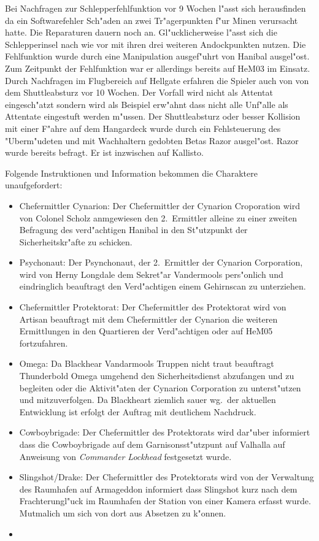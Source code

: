 Bei Nachfragen zur Schlepperfehlfunktion vor 9 Wochen l"asst sich herausfinden da\3 ein Softwarefehler Sch"aden an zwei Tr"agerpunkten f"ur Minen verursacht hatte. Die Reparaturen dauern noch an. Gl"ucklicherweise l"asst sich die Schlepperinsel nach wie vor mit ihren drei weiteren Andockpunkten nutzen. Die Fehlfunktion wurde durch eine Manipulation ausgef"uhrt von Hanibal ausgel"ost. Zum Zeitpunkt der Fehlfunktion war er allerdings bereits auf HeM03 im Einsatz. Durch Nachfragen im Flugbereich auf Hellgate erfahren die Spieler auch von von dem Shuttleabsturz vor 10 Wochen. Der Vorfall wird nicht als Attentat eingesch"atzt sondern wird als Beispiel erw"ahnt dass nicht alle Unf"alle als Attentate eingestuft werden m"ussen. Der Shuttleabsturz oder besser Kollision mit einer F"ahre auf dem Hangardeck wurde durch ein Fehlsteuerung des "Uberm"udeten und mit Wachhaltern gedobten Betas Razor ausgel"ost. Razor wurde bereits befragt. Er ist inzwischen auf Kallisto.

Folgende Instruktionen und Information bekommen die Charaktere unaufgefordert:

\begin{itemize}
	\item Chefermittler Cynarion: Der Chefermittler der Cynarion Croporation wird von Colonel Scholz anmgewiesen den 2.~Ermittler alleine zu einer zweiten Befragung des verd"achtigen Hanibal in den St"utzpunkt der Sicherheitskr"afte zu schicken.
	\item Psychonaut: Der Psynchonaut, der 2.~Ermittler der Cynarion Corporation, wird von Herny Longdale dem Sekret"ar Vandermools pers"onlich und eindringlich beauftragt den Verd"achtigen einem Gehirnscan zu unterziehen.
	\item Chefermittler Protektorat: Der Chefermittler des Protektorat wird von Artisan beauftragt mit dem Chefermittler der Cynarion die weiteren Ermittlungen in den Quartieren der Verd"achtigen oder auf HeM05 fortzufahren.
	\item Omega: Da Blackhear Vandarmools Truppen nicht traut beauftragt Thunderbold  Omega umgehend den Sicherheitsdienst abzufangen und zu begleiten oder die Aktivit"aten der Cynarion Corporation zu unterst"utzen und mitzuverfolgen. Da Blackheart ziemlich sauer wg.~der aktuellen Entwicklung ist erfolgt der Auftrag mit deutlichem Nachdruck.	
	\item Cowboybrigade: Der Chefermittler des Protektorats wird dar"uber informiert dass die Cowboybrigade auf dem Garnisonsst"utzpunt auf Valhalla auf Anweisung von \emph{Commander Lockhead} festgesetzt wurde.
	\item Slingshot/Drake: Der Chefermittler des Protektorats wird von der Verwaltung des Raumhafen auf Armageddon informiert dass Slingshot kurz nach dem Frachterungl"uck im Raumhafen der Station von einer Kamera erfasst wurde. Mutma\3lich um sich von dort aus Absetzen zu k"onnen.
	\item 
\end{itemize}

